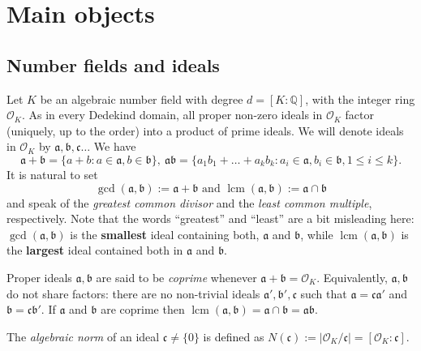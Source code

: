 \documentclass[leqno,a4paper,12pt]{article}
\DeclareMathOperator{\lcm}{lcm}
\theoremstyle{definition}
\newcommand{\Q}{\mathbb{Q}}
\newcommand{\OK}{\mathcal{O}_K}
\begin{document}
\section{Main objects}\label{se2}
\subsection{Number fields and ideals}\label{S:21}

Let $K$ be an algebraic number field with degree $d=[K:\Q]$, with the integer ring $\OK$. As in every Dedekind domain, all proper non-zero ideals in $\OK$ factor (uniquely, up to the order) into a product of prime ideals.
We will denote ideals in $\mathcal{O}_K$ by $\mathfrak{a},\mathfrak{b},\mathfrak{c}\dots$  We have
$$
\mathfrak{a}+\mathfrak{b}=\{a+b : a\in\mathfrak{a},b\in\mathfrak{b}\},\ \mathfrak{a}\mathfrak{b}=\{a_1b_1+\dots+a_kb_k : a_i\in \mathfrak{a},b_i\in\mathfrak{b},1\leq i\leq k\}.
$$
It is natural to set
\[
\gcd(\mathfrak{a},\mathfrak{b}):=\mathfrak{a}+\mathfrak{b} \text{ and }\lcm(\mathfrak{a},\mathfrak{b}):=\mathfrak{a}\cap\mathfrak{b}
\]
and speak of the \emph{greatest common divisor} and the \emph{least common multiple}, respectively. Note that the words ``greatest'' and ``least'' are a bit misleading here: $\gcd(\mathfrak{a},\mathfrak{b})$ is the \textbf{smallest} ideal containing both, $\mathfrak{a}$ and $\mathfrak{b}$, while $\lcm(\mathfrak{a},\mathfrak{b})$ is the \textbf{largest} ideal contained both in $\mathfrak{a}$ and $\mathfrak{b}$.

Proper ideals $\mathfrak{a},\mathfrak{b}$ are said to be \emph{coprime} whenever $\mathfrak{a}+\mathfrak{b}=\mathcal{O}_K$. Equivalently, $\mathfrak{a},\mathfrak{b}$ do not share factors: there are no non-trivial ideals $\mathfrak{a}',\mathfrak{b}',\mathfrak{c}$ such that $\mathfrak{a}=\mathfrak{c}\mathfrak{a}'$ and $\mathfrak{b}=\mathfrak{c}\mathfrak{b}'$. If $\mathfrak{a}$ and $\mathfrak{b}$ are coprime then $\lcm(\mathfrak{a},\mathfrak{b})=\mathfrak{a}\cap\mathfrak{b}=\mathfrak{a}\mathfrak{b}$.




The \emph{algebraic norm} of an ideal $\mathfrak{c}\neq \{0\}$ is defined as $N(\mathfrak{c}):=|\mathcal{O}_K/\mathfrak{c}|=[\mathcal{O}_K:\mathfrak{c}]$.
\end{document}
